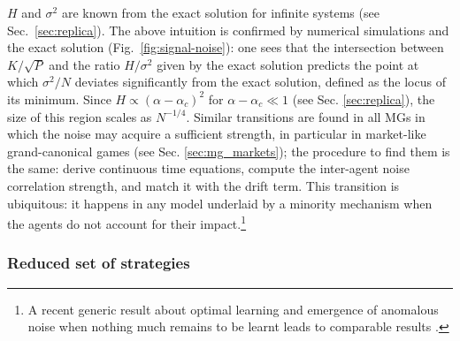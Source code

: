 \documentclass[aps,twocolumn,nofootinbib,sortedaddress,reprint]{revtex4-1}
\begin{document}
$H$ and $\sigma^2$ are known from the exact solution for infinite
systems (see Sec.~\ref{sec:replica}). The above intuition is
confirmed by numerical simulations and the exact
solution (Fig.\ \ref{fig:signal-noise}): one sees that the intersection between $K/\sqrt{P}$ and the ratio
$H/\sigma^2$ given by the exact solution predicts the point at which
$\sigma^2/N$ deviates significantly from the exact solution, defined
as the locus of its minimum. Since $H\propto (\alpha-\alpha_c)^2$ for
$\alpha-\alpha_c\ll1$ (see Sec.
\ref{sec:replica}), the size of this region scales as
$N^{-1/4}$. Similar transitions are found in all MGs in which the
noise may acquire a sufficient strength, in particular in market-like
grand-canonical games (see Sec. \ref{sec:mg_markets}); the
procedure to find them is the same: derive continuous time equations,
compute the inter-agent noise correlation strength, and match it with
the drift term. This transition is ubiquitous: it happens
in any model underlaid by a minority mechanism when the agents do not
account for their impact.\footnote{A recent generic result about optimal learning and emergence of anomalous noise when nothing much remains to be learnt leads to comparable results \cite{patzelt2011criticality}.}


\subsubsection{Reduced set of strategies}
\end{document}

